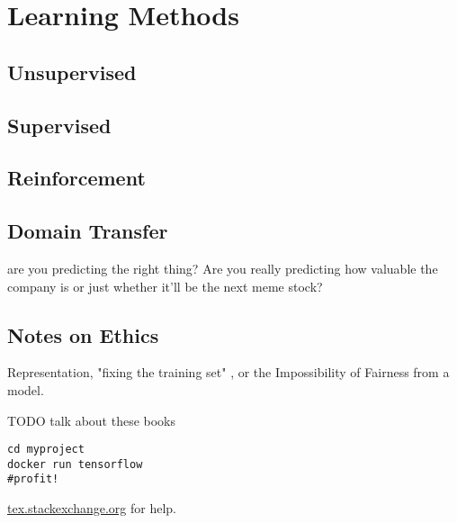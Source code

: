 \setchapterpreamble[u]{\margintoc}
\chapter{Learning Methods}

\section{Unsupervised}
\section{Supervised}
\section{Reinforcement}
\section{Domain Transfer}

are you predicting the right thing? Are you really predicting how valuable the company is or just whether it'll be the next meme stock?

\section{Notes on Ethics}

Representation, "fixing the training set" , or the Impossibility of Fairness from a model.

TODO talk about these books
\cite{Oneil2017}
\cite{Perez2019}
\cite{Blackman2022Jul}
\cite{Christian2020}


\begin{lstlisting}[style=kaolstplain,linewidth=1.5\textwidth]
cd myproject
docker run tensorflow
#profit!
\end{lstlisting}

\url{tex.stackexchange.org} for help.
